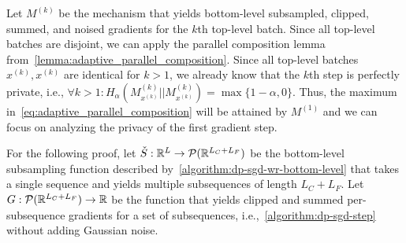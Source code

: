 Let $M^{(k)}$ be the mechanism that yields bottom-level subsampled, clipped, summed, and noised gradients for the $k$th top-level batch.
Since all top-level batches are disjoint, we can apply the parallel composition lemma from~\cref{lemma:adaptive_parallel_composition}.
Since all top-level batches $x^{(k)}, x^{(k)}$ are identical for $k > 1$, we already know that the $k$th step is perfectly private, i.e.,
$\forall k > 1 : H_\alpha(M^{(k)}_{x^{(k)}} || M^{(k)}_{x^{(k)}}) = \max \{1 - \alpha, 0 \}$.
Thus, the maximum in~\cref{eq:adaptive_parallel_composition} will be attained by $M^{(1)}$ and we can focus on analyzing the privacy of the first gradient step. 

For the following proof, let $\check{S} : {\mathbb{R}}^{L} \rightarrow \mathcal{P}({\mathbb{R}}^{L_C + L_F})$ be the bottom-level subsampling function described by~\cref{algorithm:dp-sgd-wr-bottom-level}
that takes a single sequence and yields multiple subsequences of length $L_C + L_F$.
Let $G : \mathcal{P}({\mathbb{R}}^{L_C + L_F}) \rightarrow {\mathbb{R}}$ be the function that yields clipped and summed per-subsequence  gradients
for a set of subsequences, i.e.,~\cref{algorithm:dp-sgd-step} without adding Gaussian noise.


